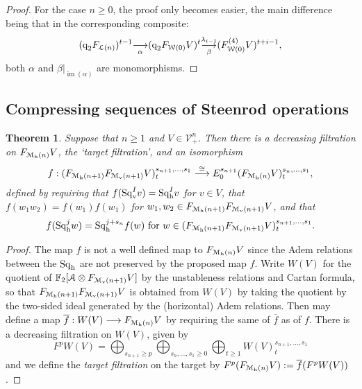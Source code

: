 \documentclass[11pt]{amsart}
\theoremstyle{plain}
\newtheorem{thm}{Theorem}[section]
\theoremstyle{definition}
\DeclareMathOperator{\im}{im}
\renewcommand{\to}{\longrightarrow}
\newcommand{\calA}{\mathcal{A}}
\newcommand{\calV}{\mathcal{V}}
\newcommand{\calw}{\mathcal{W}}
\newcommand{\call}{\mathcal{L}}
\newcommand{\calMv}{\mathcal{M}_\textup{v}}
\newcommand{\calMh}{\mathcal{M}_\textup{h}}
\theoremstyle{plain}
\newcommand{\vect}[2]{\calV^{#1}_{#2}}
\newcommand{\quadgrad}[1]{\textup{q}_{#1}}
\newcommand{\mono}{{\to}}
\newcommand{\Sqh}{\mathrm{Sq}_\textup{h}}
\newcommand{\Sqv}{\mathrm{Sq}_\textup{v}}
\newcommand{\LieSteen}{\calA}
\newcommand{\F}{\mathbb{F}}
\newcommand{\Ftwo}{\F_2}
\begin{document}
\begin{Cohomology Operations for W and U}
\begin{proof}
For the case $n\geq0$, the proof only becomes easier, the main difference being that in the corresponding composite:
\[(\quadgrad{2}F_{\call(n)})^{t-1}\underset{\smash{\alpha}}{{\to}} (\quadgrad{2}F_{\calw(0)}V)^{t}\underset{\smash{\beta}}{\overset{\lambda_{i-1}}{\mono}} (F^{(4)}_{\calw(0)}V)^{t+i-1},\]
both $\alpha$ and $\beta|_{\im(\alpha)}$ are monomorphisms.
\end{proof}

\subsection{Compressing sequences of Steenrod operations}
\begin{thm}\label{thm on compressing seqs of steenrod ops}
Suppose that $n\geq1$ and $V\in \vect{n}{+}$. Then there is a decreasing filtration on $F_{\calMh(n)}V$, the `target filtration', and an isomorphism
\[ f:(F_{\calMh(n+1)}F_{\calMv(n+1)}V)^{s_{n+1},\ldots,s_1}_t\overset{\cong}{\to} E_0^{s_{n+1}}(F_{\calMh(n)}V)^{s_n,\ldots,s_1}_t,\]
defined by requiring that
$f(\Sqv^Iv)=\Sqh^Iv$ for $v\in V$, that $f(w_1w_2)=f(w_1)f(w_1)$ for $w_1,w_2\in F_{\calMh(n+1)}F_{\calMv(n+1)}V$,
and that
\[f(\Sqh^jw)=\Sqh^{j+s_n}f(w)\textup{ for }w\in (F_{\calMh(n+1)}F_{\calMv(n+1)}V)^{s_{n+1},\ldots,s_1}_t.\]
\end{thm}
\begin{proof}
The map $f$ is not a well defined map to $F_{\calMh(n)}V$ since the Adem relations between the $\Sqh$ are not preserved by the proposed map $f$. Write $W(V)$ for the quotient of $\Ftwo [\LieSteen\otimes F_{\calMv(n+1)}V]$ by the unstableness relations and Cartan formula, so that $F_{\calMh(n+1)}F_{\calMv(n+1)}V$ is obtained from $W(V)$ by taking the quotient by the two-sided ideal generated by the (horizontal) Adem relations. Then may define a map $\overline{f}:W(V)\to F_{\calMh(n)}V$ by requiring the same of $\overline{f}$ as of $f$. There is a decreasing filtration on $W(V)$, given by 
\[F^pW(V)=\bigoplus_{s_{n+1}\geq p}\bigoplus_{s_n,\ldots,s_1\geq0}\bigoplus_{t\geq1}W(V)^{s_{n+1},\ldots,s_1}_t\]
 and we define the \emph{target filtration} on the target by $F^p(F_{\calMh(n)}V):=\overline{f}(F^pW(V))$.


\end{proof}
\end{Cohomology Operations for W and U}
\end{document}
